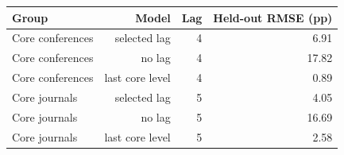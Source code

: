 \begin{tabular}{@{}lrrr@{}}
\toprule
Group & Model & Lag & Held-out RMSE (pp) \\
\midrule
Core conferences & selected lag & 4 & 6.91 \\
Core conferences & no lag & 4 & 17.82 \\
Core conferences & last core level & 4 & 0.89 \\
Core journals & selected lag & 5 & 4.05 \\
Core journals & no lag & 5 & 16.69 \\
Core journals & last core level & 5 & 2.58 \\
\bottomrule
\end{tabular}
